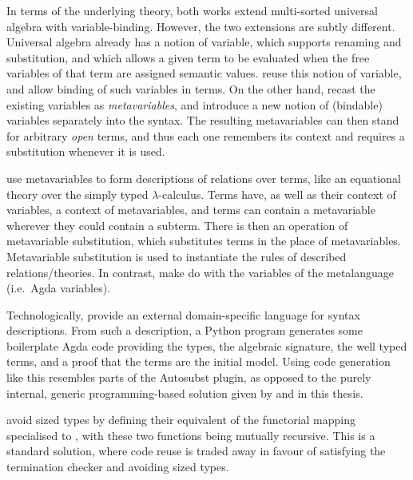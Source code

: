 In terms of the underlying theory, both works extend multi-sorted universal
algebra with variable-binding.
However, the two extensions are subtly different.
Universal algebra already has a notion of variable, which supports renaming and
substitution, and which allows a given term to be evaluated when the free
variables of that term are assigned semantic values.
\citeauthor{AACMM21} reuse this notion of variable, and allow binding of such
variables in terms.
On the other hand, \citeauthor{FS22} recast the existing variables as
\emph{metavariables}, and introduce a new notion of (bindable) variables
separately into the syntax.
The resulting metavariables can then stand for arbitrary \emph{open} terms, and
thus each one remembers its context and requires a substitution whenever it is
used.


 use metavariables to form descriptions of relations over
terms, like an equational theory over the simply typed $\lambda$-calculus.
Terms have, as well as their context of variables, a context of metavariables,
and terms can contain a metavariable wherever they could contain a subterm.
There is then an operation of metavariable substitution, which substitutes terms
in the place of metavariables.
Metavariable substitution is used to instantiate the rules of described
relations/theories.
In contrast, \citeauthor{AACMM21} make do with the variables of the metalanguage
(i.e.\ Agda variables).

Technologically, \citeauthor{FS22} provide an external domain-specific language
for syntax descriptions.
From such a description, a Python program generates some boilerplate Agda code
providing the types, the algebraic signature, the well typed terms, and a proof
that the terms are the initial model.
Using code generation like this resembles parts of the Autosubst plugin, as
opposed to the purely internal, generic programming-based solution given by
\citeauthor{AACMM21} and in this thesis.

 avoid sized types by defining their equivalent of the
functorial mapping  specialised to , with
these two functions being mutually recursive.
This is a standard solution, where code reuse is traded away in favour of
satisfying the termination checker and avoiding sized types.
